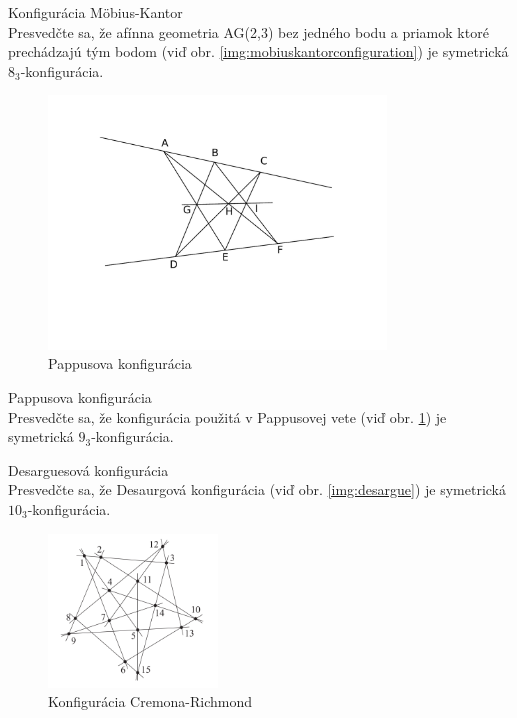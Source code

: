 \begin{exercise}{Konfigurácia Möbius-Kantor}\\
	\label{ex:mobiuskantor83}
	Presvedčte sa, že afínna geometria AG(2,3) bez jedného bodu a priamok ktoré prechádzajú tým bodom (viď obr. \ref{img:mobiuskantorconfiguration}) je symetrická $8_3$-konfigurácia. 
\end{exercise}

\begin{figure}
	\centering
	\includegraphics[width=0.8\textwidth]{pappus_configuration}
	\caption{Pappusova konfigurácia}
	\label{img:pappus}
\end{figure}

\begin{exercise}{Pappusova konfigurácia}\\
	\label{ex:pappus93}
	Presvedčte sa, že konfigurácia použitá v Pappusovej vete (viď obr. \ref{img:pappus}) je symetrická $9_3$-konfigurácia. 
\end{exercise}

\begin{exercise}{Desarguesová konfigurácia}\\
	\label{ex:desaurg103}
	Presvedčte sa, že Desaurgová konfigurácia (viď obr. \ref{img:desargue}) je symetrická $10_3$-konfigurácia. 
\end{exercise}

\begin{figure}
	\centering
	\includegraphics[width=0.4\textwidth]{images/stellar_cremona_richmond}
	\caption{Konfigurácia Cremona-Richmond\protect\footnotemark}
	\label{img:cremonarichmondconfiguration}
\end{figure}

